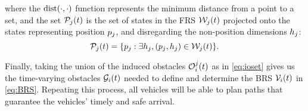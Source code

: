 \noindent where the $\text{dist}(\cdot, \cdot)$ function represents the minimum distance from a point to a set, and the set $\mathcal{P}_j(t)$ is the set of states in the FRS $\mathcal{W}_j(t)$ projected onto the states representing position $p_j$, and disregarding the non-position dimensions $h_j$:
\vspace{-0.4em}
\begin{equation}
\mathcal{P}_j(t) = \{p_j: \exists h_j, (p_j, h_j) \in \mathcal{W}_j(t)\}.
\end{equation}

Finally, taking the union of the induced obstacles $\mathcal{O}_i^j(t)$ as in \eqref{eq:ioset} gives us the time-varying obstacles $\mathcal{G}_i(t)$ needed to define and determine the BRS $\mathcal{V}_i(t)$ in \eqref{eq:BRS}. Repeating this process, all vehicles will be able to plan paths that guarantee the vehicles' timely and safe arrival.

